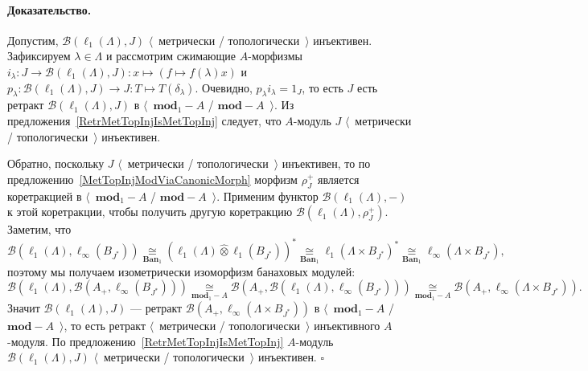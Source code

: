 \documentclass[12pt]{article}
\newcommand{\projtens}{\mathbin{\widehat{\otimes}}}
\newcommand{\isom}[1]{\mathop{\mathbin{\cong}}\limits_{#1}}
\renewenvironment{proof}{\paragraph{Доказательство.}}{\hfill$\square$\medskip}
\begin{document}
\begin{proof}
    Допустим, $\mathcal{B}(\ell_1(\Lambda), J)$  $\langle$~метрически /
    топологически~$\rangle$ инъективен. Зафиксируем $\lambda\in\Lambda$ и
    рассмотрим сжимающие $A$-морфизмы
    $i_\lambda:J\to\mathcal{B}(\ell_1(\Lambda),J):x\mapsto(f\mapsto
        f(\lambda)x)$ и $p_\lambda:\mathcal{B}(\ell_1(\Lambda),J)\to J:T\mapsto
        T(\delta_\lambda)$. 
    Очевидно, $p_\lambda i_\lambda=1_J$, то есть $J$ есть
    ретракт $\mathcal{B}(\ell_1(\Lambda),J)$ в $\langle$~$\mathbf{mod}_1-A$ /
    $\mathbf{mod}-A$~$\rangle$. Из предложения~\ref{RetrMetTopInjIsMetTopInj}
    следует, что $A$-модуль $J$ $\langle$~метрически / топологически~$\rangle$
    инъективен.

    Обратно, поскольку $J$ $\langle$~метрически / топологически~$\rangle$
    инъективен, то по предложению~\ref{MetTopInjModViaCanonicMorph} морфизм
    $\rho_J^+$ является коретракцией в $\langle$~$\mathbf{mod}_1-A$ /
    $\mathbf{mod}-A$~$\rangle$. Применим функтор
    $\mathcal{B}(\ell_1(\Lambda),-)$ к этой коретракции, чтобы получить другую
    коретракцию $\mathcal{B}(\ell_1(\Lambda),\rho_J^+)$. Заметим, что
    $$
        \mathcal{B}(\ell_1(\Lambda),\ell_\infty(B_{J^*}))
        \isom{\mathbf{Ban}_1}
        {(\ell_1(\Lambda)\projtens \ell_1(B_{J^*}))}^*
        \isom{\mathbf{Ban}_1}
        {\ell_1(\Lambda\times B_{J^*})}^*
        \isom{\mathbf{Ban}_1}
        \ell_\infty(\Lambda\times B_{J^*}),
    $$
    поэтому мы получаем изометрически изоморфизм банаховых модулей:
    $$
        \mathcal{B}(\ell_1(\Lambda),\mathcal{B}(A_+,\ell_\infty(B_{J^*})))
        \isom{\mathbf{mod}_1-A}
        \mathcal{B}(A_+,\mathcal{B}(\ell_1(\Lambda),\ell_\infty(B_{J^*})))
        \isom{\mathbf{mod}_1-A}
        \mathcal{B}(A_+,\ell_\infty(\Lambda\times B_{J^*})).
    $$
    Значит $\mathcal{B}(\ell_1(\Lambda),J)$ --- ретракт
    $\mathcal{B}(A_+,\ell_\infty(\Lambda\times B_{J^*}))$ в
    $\langle$~$\mathbf{mod}_1-A$ / $\mathbf{mod}-A$~$\rangle$, то есть ретракт
    $\langle$~метрически / топологически~$\rangle$ инъективного $A$-модуля. По
    предложению~\ref{RetrMetTopInjIsMetTopInj} $A$-модуль
    $\mathcal{B}(\ell_1(\Lambda), J)$ $\langle$~метрически /
    топологически~$\rangle$ инъективен.
\end{proof}

\end{document}
